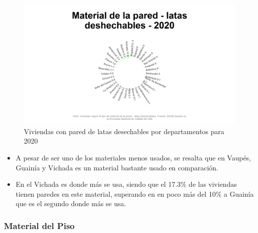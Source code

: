     \begin{figure}[H]
        \caption{Viviendas con pared de latas desechables por departamentos para 2020 \label{map_result_2} }
        \begin{center}
        \includegraphics[width=\textwidth,keepaspectratio]{img/var_158_static.png}
        \end{center}
    \end{figure}
            \begin{itemize}
                    \item A pesar de ser uno de los materiales menos usados, se resalta que en Vaupés, Guainía y Vichada es un material bastante usado en comparación.
                    \item En el Vichada es donde más se usa, siendo que el 17.3\% de las viviendas tienen paredes en este material, superando en en poco más del 10\% a Guainía que es el segundo donde más se usa.
                    \end{itemize}

        \subsubsection{Material del Piso}


